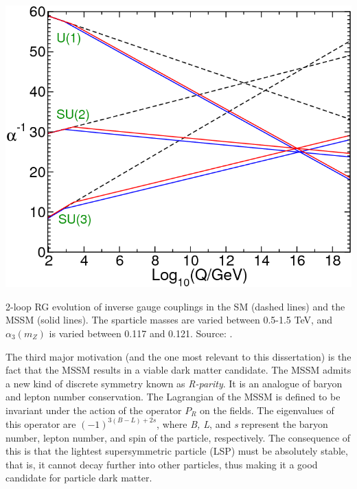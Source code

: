 \begin{marginfigure}[-6.5in]
    \includegraphics[width=\textwidth]{images/gauge_coupling_unification}
  \caption{2-loop RG evolution of inverse gauge couplings in the SM (dashed lines) and the MSSM (solid lines). The sparticle masses are varied between 0.5-1.5 TeV, and $\alpha_3(m_Z)$ is varied between 0.117 and 0.121. Source: \citep{Martin1997}.}
  \label{fig:gauge_coupling_unification}
\end{marginfigure}

The third major motivation (and the one most relevant to this dissertation) is the fact that the MSSM results in a viable dark matter candidate. The MSSM admits a new kind of discrete symmetry known as \emph{R-parity}. It is an analogue of baryon and lepton number conservation. The Lagrangian of the MSSM is defined to be invariant under the action of the operator $P_R$ on the fields. The eigenvalues of this operator are $(-1)^{3(B-L)+2s}$, where \emph{B, L}, and \emph{s} represent the baryon number, lepton number, and spin of the particle, respectively. The consequence of this is that the lightest supersymmetric particle (LSP) must be absolutely stable, that is, it cannot decay further into other particles, thus making it a good candidate for particle dark matter.

